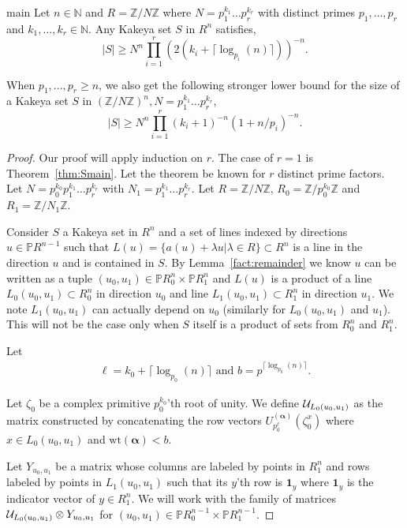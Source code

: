 \documentclass[11pt]{article}
\numberwithin{equation}{section}
\def\Z{{\mathbb{Z}}}
\def\N{{\mathbb{N}}}
\def\P{{\mathbb{P}}}
\def\cU{{\cal U}}
\def\Ind{{\mathbf{1}}}
\def\balpha{{\bm \alpha}}
\begin{document}
\begin{repthm}{main}
Let $n\in \N$ and $R=\Z/N\Z$  where $N=p_1^{k_1}\hdots p_r^{k_r}$ with distinct primes $p_1,\hdots,p_r$ and $k_1,\hdots,k_r\in \N$. Any Kakeya set $S$ in $R^n$ satisfies,
$$|S|\ge N^n\prod\limits_{i=1}^r (2(k_i+\lceil \log_{p_i}(n)\rceil))^{-n}.$$

When $p_1,\hdots,p_r\ge n$, we also get the following stronger lower bound for the size of a Kakeya set $S$ in $(\Z/N\Z)^n,N=p_1^{k_1}\hdots p_r^{k_r}$,
$$|S|\ge N^n\prod\limits_{i=1}^r(k_i+1)^{-n}(1+n/p_i)^{-n}.$$
\end{repthm}
\begin{proof}
Our proof will apply induction on $r$. The case of $r=1$ is Theorem~\ref{thm:Smain}. Let the theorem be known for $r$ distinct prime factors.
Let $N=p_0^{k_0}p_1^{k_1}\hdots p_r^{k_r}$ with $N_1=p_1^{k_1}\hdots p_r^{k_r}$. Let $R=\Z/N\Z$, $R_0=\Z/p_0^{k_0}\Z$ and $R_1=\Z/N_1\Z$. 

Consider $S$ a Kakeya set in $R^n$ and a set of lines indexed by directions $u\in \P R^{n-1}$ such that $L(u)=\{a(u)+\lambda u|\lambda \in R\}\subset R^n$ is a line in the direction $u$ and is contained in $S$. By Lemma~\ref{fact:remainder} we know $u$ can be written as a tuple $(u_0,u_1) \in \P R_0^{n} \times \P R_1^{n}$ and $L(u)$ is a product of a line $L_{0}(u_0,u_1)\subset R_0^n$ in direction $u_0$ and line $L_{1}(u_0,u_1)\subset R_1^n$ in direction $u_1$. We note $L_1(u_0,u_1)$ can actually depend on $u_0$ (similarly for $L_0(u_0,u_1)$ and $u_1$). This will not be the case only when $S$ itself is a product of sets from $R_0^n$ and $R_1^n$.

Let
\begin{align}\label{eq:b2}
\ell = k_0+\lceil \log_{p_0}(n)\rceil \text{ and } b =p^{\lceil \log_{p_0}(n)\rceil}.
\end{align} 

Let $\zeta_0$ be a complex primitive $p_0^{k_0}$'th root of unity. We define $\cU_{L_{0}(u_0,u_1)}$ as the matrix constructed by concatenating the row vectors $U_{p_0^\ell}^{(\balpha)}(\zeta_0^x)$ where $x\in L_{0}(u_0,u_1)$ and $\text{wt}(\balpha)<b$.

Let $Y_{u_0,u_1}$ be a matrix whose columns are labeled by points in $R_1^n$ and rows labeled by points in $L_1(u_0,u_1)$ such that its $y$'th row is $\Ind_y$ where $\Ind_y$ is the indicator vector of $y\in R_1^n$. We will work with the family of matrices $\cU_{L_{0}(u_0,u_1)}\otimes Y_{u_0,u_1}$ for $(u_0,u_1)\in \P R_0^{n-1}\times \P R_1^{n-1}$.


\end{proof}
\end{document}
